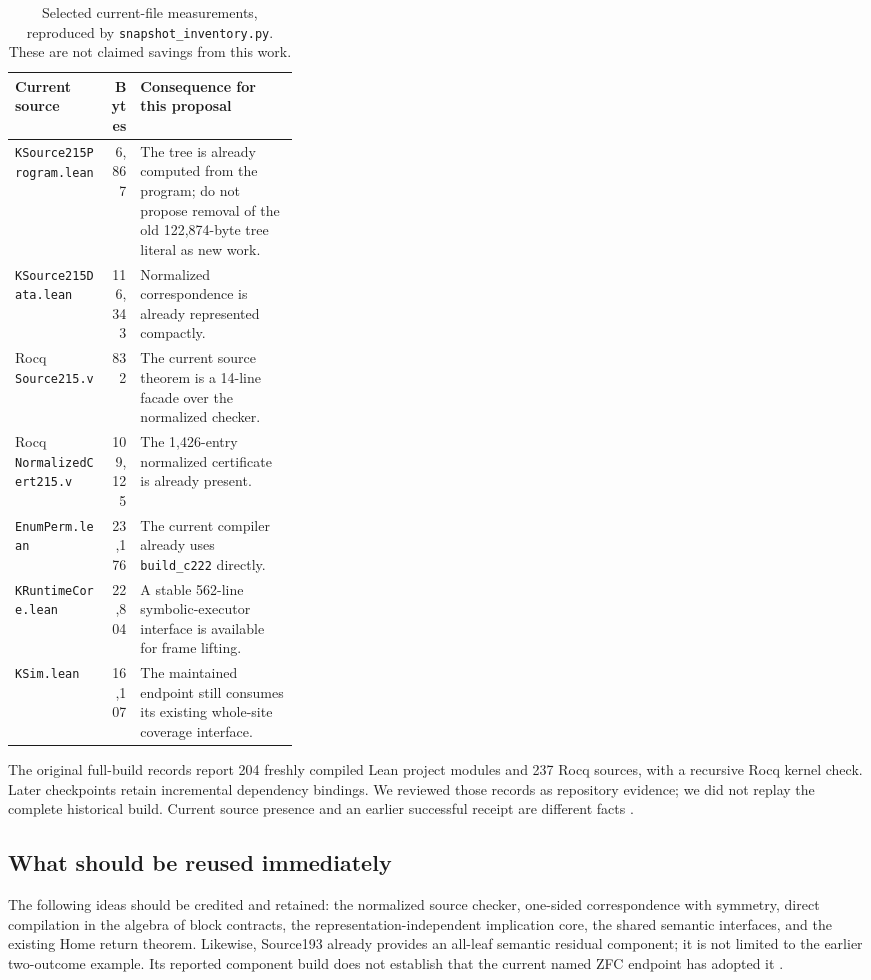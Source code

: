 \documentclass[11pt,letterpaper]{article}
\theoremstyle{definition}
\theoremstyle{remark}
\newcommand{\code}[1]{\texttt{#1}}
\begin{document}
\begin{table}[ht]
\centering\small
\begin{tabularx}{\linewidth}{@{}p{0.33\linewidth}rX@{}}
\toprule
Current source & Bytes & Consequence for this proposal\\
\midrule
\code{KSource215Program.lean} & 6,867 & The tree is already computed from the program; do not propose removal of the old 122,874-byte tree literal as new work.\\
\code{KSource215Data.lean} & 116,343 & Normalized correspondence is already represented compactly.\\
Rocq \code{Source215.v} & 832 & The current source theorem is a 14-line facade over the normalized checker.\\
Rocq \code{NormalizedCert215.v} & 109,125 & The 1,426-entry normalized certificate is already present.\\
\code{EnumPerm.lean} & 23,176 & The current compiler already uses \code{build\_c222} directly.\\
\code{KRuntimeCore.lean} & 22,804 & A stable 562-line symbolic-executor interface is available for frame lifting.\\
\code{KSim.lean} & 16,107 & The maintained endpoint still consumes its existing whole-site coverage interface.\\
\bottomrule
\end{tabularx}
\caption{Selected current-file measurements, reproduced by
\code{snapshot\_inventory.py}. These are not claimed savings from this work.}
\label{tab:baseline}
\end{table}

The original full-build records report 204 freshly compiled Lean project
modules and 237 Rocq sources, with a recursive Rocq kernel check. Later
checkpoints retain incremental dependency bindings. We reviewed those records
as repository evidence; we did not replay the complete historical build.
Current source presence and an earlier successful receipt are different facts
\cite{verification,phase15}.

\subsection{What should be reused immediately}

The following ideas should be credited and retained: the normalized source
checker, one-sided correspondence with symmetry, direct compilation in the
algebra of block contracts, the representation-independent implication core,
the shared semantic interfaces, and the existing Home return theorem.
Likewise, Source193 already provides an all-leaf semantic residual component;
it is not limited to the earlier two-outcome example. Its reported component
build does not establish that the current named ZFC endpoint has adopted it
\cite{phase15,round13,source193}.
\end{document}
